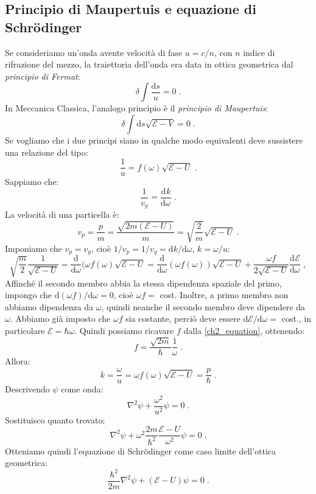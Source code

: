 \documentclass[10pt,a4paper]{report}
\theoremstyle{definition}
\newcommand{\dev}[3][]{\frac{\mathrm{d}^{#1} #2}{\mathrm{d} #3^{#1}}}
\numberwithin{equation}{section}
\newcommand{\diff}[1][]{\mathrm{d}#1}
\begin{document}
\subsection{Principio di Maupertuis e equazione di Schrödinger}
Se consideriamo un'onda avente velocità di fase $u=c/n$, con $n$ indice di rifrazione del mezzo, la traiettoria dell'onda era data in ottica geometrica dal \textit{principio di Fermat}:
\begin{equation}
\delta\int\frac{\diff{s}}{u}=0\;.
\end{equation}
In Meccanica Classica, l'analogo principio è il \textit{principio di Maupertuis}:
\begin{equation}
\delta\int\diff{s}\sqrt{\mathcal{E}-V}=0\;.
\end{equation}
Se vogliamo che i due principi siano in qualche modo equivalenti deve sussistere una relazione del tipo:
$$
\frac{1}{u}=f(\omega)\sqrt{\mathcal{E}-U}\;.
$$
Sappiamo che:
$$
\frac{1}{v_g}=\dev{k}{\omega}\;.
$$
La velocità di una particella è:
\begin{equation}
v_p=\frac{p}{m}=\frac{\sqrt{2m(\mathcal{E}-U)}}{m}=\sqrt{\frac{2}{m}}\sqrt{\mathcal{E}-U}\;.
\end{equation}
Imponiamo che $v_p=v_g$, cioè $1/v_p=1/v_g=\diff{k}/\diff{\omega}$, $k=\omega/u$:
\begin{equation}
\sqrt{\frac{m}{2}}\frac{1}{\sqrt{\mathcal{E}-U}}=\frac{\mathrm{d}}{\diff{\omega}}(\omega f(\omega)\sqrt{\mathcal{E}-U}=\frac{\mathrm{d}}{\diff{\omega}}(\omega f(\omega))\sqrt{\mathcal{E}-U}+\frac{\omega f}{2\sqrt{\mathcal{E}-U}}\dev{\mathcal{E}}{\omega}\;, \label{ch2_equation}
\end{equation}
Affinché il secondo membro abbia la stessa dipendenza spaziale del primo, impongo che $\diff{(\omega f)}/\diff{\omega}=0$, cioè $\omega f=$ cost. Inoltre, a primo membro non abbiamo dipendenza da $\omega$, quindi neanche il secondo membro deve dipendere da $\omega$. Abbiamo già imposto che $\omega f$ sia costante, perciò deve essere $\diff{\mathcal{E}}/\diff{\omega}=$ cost., in particolare $\mathcal{E}=\hbar\omega$. Quindi possiamo ricavare $f$ dalla \eqref{ch2_equation}, ottenendo:
\begin{equation}
f=\frac{\sqrt{2m}}{\hbar}\frac{1}{\omega}\;.
\end{equation}
Allora:
\begin{equation}
k=\frac{\omega}{u}=\omega f(\omega)\sqrt{\mathcal{E}-U}=\frac{p}{\hbar}\;.
\end{equation}
Descrivendo $\psi$ come onda:
$$
\nabla^2\psi+\frac{\omega^2}{u^2}\psi=0\;.
$$
Sostituisco quanto trovato:
$$
\nabla^2\psi+\omega^2\frac{2m}{\hbar^2}\frac{\mathcal{E}-U}{\omega^2}\psi=0\;.
$$
Otteniamo quindi l'equazione di Schrödinger come caso limite dell'ottica geometrica:
\begin{equation}
\frac{\hbar^2}{2m}\nabla^2\psi+(\mathcal{E}-U)\psi=0\;.
\end{equation}
\end{document}
